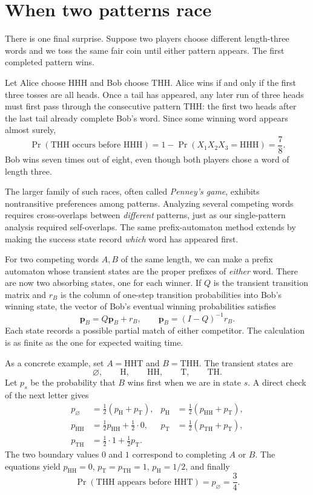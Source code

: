 \section{When two patterns race}

There is one final surprise. Suppose two players choose different length-three words and we toss the same fair coin until either pattern appears. The first completed pattern wins.

Let Alice choose \(\mathrm{HHH}\) and Bob choose \(\mathrm{THH}\). Alice wins if and only if the first three tosses are all heads. Once a tail has appeared, any later run of three heads must first pass through the consecutive pattern \(\mathrm{THH}\): the first two heads after the last tail already complete Bob's word. Since some winning word appears almost surely,
\begin{equation}
 \Pr(\mathrm{THH}\text{ occurs before }\mathrm{HHH})
 =1-\Pr(X_1X_2X_3=\mathrm{HHH})
 =\frac78.
 \label{eq:N20261107-penney}
\end{equation}
Bob wins seven times out of eight, even though both players chose a word of length three.

The larger family of such races, often called \emph{Penney's game}, exhibits nontransitive preferences among patterns. Analyzing several competing words requires cross-overlaps between \emph{different} patterns, just as our single-pattern analysis required self-overlaps. The same prefix-automaton method extends by making the success state record \emph{which} word has appeared first.

For two competing words \(A,B\) of the same length, we can make a prefix automaton whose transient states are the proper prefixes of \emph{either} word. There are now two absorbing states, one for each winner. If \(Q\) is the transient transition matrix and \(r_B\) is the column of one-step transition probabilities into Bob's winning state, the vector of Bob's eventual winning probabilities satisfies
\[
 \mathbf p_B=Q\mathbf p_B+r_B,
 \qquad
 \mathbf p_B=(I-Q)^{-1}r_B.
\]
Each state records a possible partial match of either competitor. The calculation is as finite as the one for expected waiting time.

As a concrete example, set \(A=\mathrm{HHT}\) and \(B=\mathrm{THH}\). The transient states are
\[
 \varnothing,\qquad\mathrm H,\qquad\mathrm{HH},
 \qquad\mathrm T,\qquad\mathrm{TH}.
\]
Let \(p_s\) be the probability that \(B\) wins first when we are in state \(s\). A direct check of the next letter gives
\[
\begin{aligned}
p_\varnothing&=\tfrac12(p_{\mathrm H}+p_{\mathrm T}),
&
p_{\mathrm H}&=\tfrac12(p_{\mathrm{HH}}+p_{\mathrm T}),\\
p_{\mathrm{HH}}&=\tfrac12p_{\mathrm{HH}}+\tfrac12\cdot0,
&
p_{\mathrm T}&=\tfrac12(p_{\mathrm{TH}}+p_{\mathrm T}),\\
p_{\mathrm{TH}}&=\tfrac12\cdot1+\tfrac12p_{\mathrm T}.
\end{aligned}
\]
The two boundary values \(0\) and \(1\) correspond to completing \(A\) or \(B\). The equations yield \(p_{\mathrm{HH}}=0\), \(p_{\mathrm T}=p_{\mathrm{TH}}=1\), \(p_{\mathrm H}=1/2\), and finally
\[
 \boxed{\Pr(\mathrm{THH}\text{ appears before }\mathrm{HHT})
 =p_\varnothing=\frac34.}
\]

